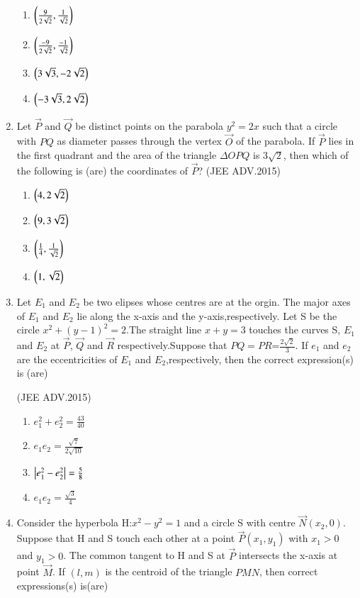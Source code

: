 \documentclass[journal,12pt,onecolumn]{IEEEtran}
\theoremstyle{remark}
\begin{document}
\begin{enumerate}
		\begin{enumerate}
			\item $\left(\frac{9}{2\sqrt{2}},\frac{1}{\sqrt{2}}\right)$ 
			\item $ \left(\frac{-9}{2\sqrt{2}},\frac{-1}{\sqrt{2}}\right)$
			\item $\left(3\sqrt{3},-2\sqrt{2}\right)$
			\item $ \left(-3\sqrt{3},2\sqrt{2}\right)$
		
		\end{enumerate}

	\item Let $\vec{P}$ and $\vec{Q}$ be distinct points on the parabola $y^2=2x$ such 
		that a circle with $PQ$ as diameter passes through the vertex
		$\vec{O}$ of the parabola. If $\vec{P}$ lies in the first quadrant and the area
		of the triangle  \(\Delta \)$OPQ$ is 3$\sqrt{2}$, then which of the following is
		(are) the coordinates of $\vec{P}$?  
		\hfill(JEE ADV.2015)
		
		\begin{enumerate}
			\item $ \left(4,2\sqrt{2}\right)$
			\item $\left(9,3\sqrt{2}\right)$
			\item $ \left(\frac{1}{4},\frac{1}{\sqrt{2}}\right)$
			\item  $ \left(1,\sqrt{2}\right)$
		\end{enumerate}
	\item Let $ E_1$  and $ E_2$ be two elipses whose centres are at the orgin.
              The major axes of $E_1$ and $ E_2$ lie along the x-axis and the
              y-axis,respectively. Let S be the circle $x^2+(y-1)^2=2$.The
		straight line $x+y=3$ touches the curves S, $E_1$ and $E_2$ at $\vec{P}$, $\vec{Q}$
		and $\vec{R}$ respectively.Suppose that $PQ=PR$=$\frac{2\sqrt{2}}{3}$. If $e_1$ and
              $e_2$ are the eccentricities of $E_1$ and $E_2$,respectively, then the 
              correct expression(s) is (are) 
	        
		\hfill(JEE ADV.2015)
		
		\begin{enumerate}
			\item $e_1^2+e_2^2=\frac{43}{40}$
			\item $e_1e_2=\frac{\sqrt{7}}{2\sqrt{10}}$
			\item $\left\vert e_1^2-e_2^2\right\vert=\frac{5}{8}$
			\item $e_1e_2=\frac{\sqrt{3}}{4}$ 
		\end{enumerate}
	\item Consider the hyperbola H:$x^2-y^2=1$ and a circle S with 
		centre $\vec{N}(x_2,0)$. Suppose that H and S touch each other at a 
	      point $\vec{P}(x_1,y_1)$ with $x_1>0$ and $y_1>0$. The common tangent to H and S at $\vec{P}$ intersects the x-axis at point $\vec{M}$. If $(l,m)$ is the centroid of the triangle $PMN$, then correct expressions(s) is(are)
	      

\end{enumerate}
\end{document}
